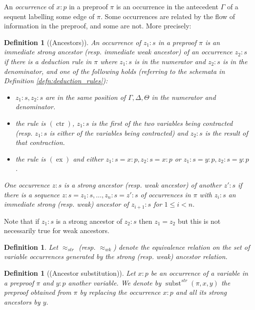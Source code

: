 \documentclass[english,letter paper,12pt,leqno]{article}
\theoremstyle{example}
\newtheorem{definition}[theorem]{Definition}
\numberwithin{equation}{section}
\begin{document}
An \emph{occurrence} of $x:p$ in a preproof $\pi$ is an occurrence in the antecedent $\Gamma$ of a sequent labelling some edge of $\pi$. Some occurrences are related by the flow of information in the preproof, and some are not. More precisely:

\begin{definition}[(Ancestors)]
An occurrence of $z_1:s$ in a preproof $\pi$ is an \emph{immediate strong ancestor} (resp. \emph{immediate weak ancestor}) of an occurrence $z_2:s$ if there is a deduction rule in $\pi$ where $z_1:s$ is in the numerator and $z_2:s$ is in the denominator, and one of the following holds (referring to the schemata in Definition \ref{defn:deduction_rules}):
\begin{itemize}
\item[(i)] $z_1:s, z_2:s$ are in the same position of $\Gamma, \Delta, \Theta$ in the numerator and denominator.
\item[(ii)] the rule is $(\operatorname{ctr})$, $z_1:s$ is the first of the two variables being contracted (resp. $z_1:s$ is either of the variables being contracted) and $z_2:s$ is the result of that contraction.
\item[(iii)] the rule is $(\operatorname{ex})$ and either $z_1:s = x:p, z_2:s = x:p$ or $z_1:s = y:p, z_2:s = y:p$.
\end{itemize}
One occurrence $z:s$ is a \emph{strong ancestor} (resp. \emph{weak ancestor}) of another $z':s$ if there is a sequence $z:s = z_1:s, \ldots, z_n:s = z':s$ of occurrences in $\pi$ with $z_i:s$ an immediate strong (resp. weak) ancestor of $z_{i+1}:s$ for $1 \le i < n$.
\end{definition}

Note that if $z_1:s$ is a strong ancestor of $z_2:s$ then $z_1 = z_2$ but this is not necessarily true for weak ancestors.

\begin{definition}\label{defn:approx} Let $\approx_{str}$ (resp. $\approx_{wk}$) denote the equivalence relation on the set of variable occurrences generated by the strong (resp. weak) ancestor relation.
\end{definition}

\begin{definition}[(Ancestor substitution)]\label{defn:ancestor_sub}
Let $x:p$ be an occurrence of a variable in a preproof $\pi$ and $y:p$ another variable. We denote by $\operatorname{subst}^{str}(\pi, x, y)$ the preproof obtained from $\pi$ by replacing the occurrence $x:p$ and all its strong ancestors by $y$.
\end{definition}
\end{document}
